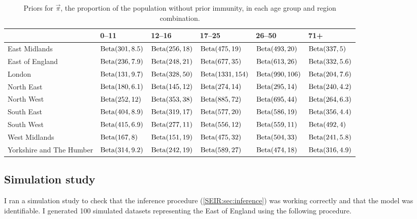 \documentclass[thesis.tex]{subfiles}
\begin{document}
\begin{landscape}
\begin{table}
\centering
\begin{tabular}{l|lllll}
         & 0--11 & 12--16 & 17--25 & 26--50 & 71+ \\
        \hline
        East Midlands & $\operatorname{Beta}(301, 8.5)$ & $\operatorname{Beta}(256, 18)$ & $\operatorname{Beta}(475, 19)$ & $\operatorname{Beta}(493, 20)$ & $\operatorname{Beta}(337, 5)$ \\
        East of England & $\operatorname{Beta}(236, 7.9)$ & $\operatorname{Beta}(248, 21)$ & $\operatorname{Beta}(677, 35)$ & $\operatorname{Beta}(613, 26)$ & $\operatorname{Beta}(332, 5.6)$ \\
        London & $\operatorname{Beta}(131, 9.7)$ & $\operatorname{Beta}(328, 50)$ & $\operatorname{Beta}(1331, 154)$ & $\operatorname{Beta}(990, 106)$ & $\operatorname{Beta}(204, 7.6)$ \\
        North East & $\operatorname{Beta}(180, 6.1)$ & $\operatorname{Beta}(145, 12)$ & $\operatorname{Beta}(274, 14)$ & $\operatorname{Beta}(295, 14)$ & $\operatorname{Beta}(240, 4.2)$ \\
        North West & $\operatorname{Beta}(252, 12)$ & $\operatorname{Beta}(353, 38)$ & $\operatorname{Beta}(885, 72)$ & $\operatorname{Beta}(695, 44)$ & $\operatorname{Beta}(264, 6.3)$ \\
        South East & $\operatorname{Beta}(404, 8.9)$ & $\operatorname{Beta}(319, 17)$ & $\operatorname{Beta}(577, 20)$ & $\operatorname{Beta}(586, 19)$ & $\operatorname{Beta}(356, 4.4)$ \\
        South West & $\operatorname{Beta}(415, 6.9)$ & $\operatorname{Beta}(277, 11)$ & $\operatorname{Beta}(556, 12)$ & $\operatorname{Beta}(559, 11)$ & $\operatorname{Beta}(492, 4)$ \\
        West Midlands & $\operatorname{Beta}(167, 8)$ & $\operatorname{Beta}(151, 19)$ & $\operatorname{Beta}(475, 32)$ & $\operatorname{Beta}(504, 33)$ & $\operatorname{Beta}(241, 5.8)$ \\
        Yorkshire and The Humber & $\operatorname{Beta}(314, 9.2)$ & $\operatorname{Beta}(242, 19)$ & $\operatorname{Beta}(589, 27)$ & $\operatorname{Beta}(474, 18)$ & $\operatorname{Beta}(316, 4.9)$ \\
    \end{tabular}
\caption{Priors for $\vec{\pi}$, the proportion of the population without prior immunity, in each age group and region combination.}
\label{SEIR:table:immunity-prior}
\end{table}
\end{landscape}

\subsection{Simulation study} \label{SEIR:sec:sim-study}

I ran a simulation study to check that the inference procedure (\cref{SEIR:sec:inference}) was working correctly and that the model was identifiable.
I generated 100 simulated datasets representing the East of England using the following procedure.
\end{document}
